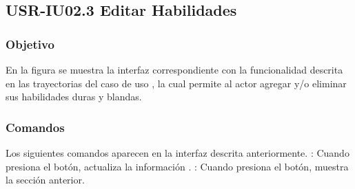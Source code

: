 \clearpage
\subsection{USR-IU02.3 Editar Habilidades}

\subsubsection{Objetivo}
En la figura  se muestra la interfaz correspondiente con la funcionalidad descrita en las
trayectorias del caso de uso  , la cual permite al actor agregar y/o eliminar sus habilidades duras y blandas.

\subsubsection{Comandos}
Los siguientes comandos aparecen en la interfaz descrita anteriormente.
\Titem {} : Cuando presiona el botón, actualiza la información .
\Titem {} : Cuando presiona el botón, muestra la sección anterior.%



\clearpage
